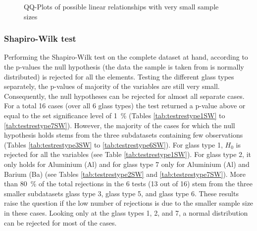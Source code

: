 \documentclass[a4paper, 12pt, titlepage, headsepline, listof = totoc, bibliography = totoc, numbers = noenddot]{scrartcl}
\begin{document}
\begin{figure}[h!]
\begin{subfigure}{.5\textwidth}
  \vspace{-1cm}
  \caption{}
  \label{fig:QQsampleslin2b}
\end{subfigure}
\caption{QQ-Plots of possible linear relationships with very small sample sizes}
\label{fig:QQsampleslin2}
\end{figure}

\subsubsection{Shapiro-Wilk test}\label{sec:shapiro-original}
Performing the Shapiro-Wilk test on the complete dataset at hand, according to the p-values the null hypothesis (the data the sample is taken from is normally distributed) is rejected for all the elements.
Testing the different glass types separately, the p-values of majority of the variables are still very small. Consequently, the null hypotheses can be rejected for almost all separate cases. For a total 16 cases (over all 6 glass types) the test returned a p-value above or equal to the set significance level of 1\, \% (Tables \ref{tab:testrestype1SW} to \ref{tab:testrestype7SW}). However, the majority of the cases for which the null hypothesis holds stems from the three subdatasets containing few observations (Tables \ref{tab:testrestype3SW} to \ref{tab:testrestype6SW}). For glass type 1, $H_0$ is rejected for all the variables (see Table \ref{tab:testrestype1SW}). For glass type 2, it only holds for Aluminium (Al) and for glass type 7 only for Aluminium (Al) and Barium (Ba) (see Tables \ref{tab:testrestype2SW} and \ref{tab:testrestype7SW}).
More than 80\, \% of the total rejections in the 6 tests (13 out of 16) stem from the three smaller subdatasets glass type 3, glass type 5, and glass type 6. These results raise the question if the low number of rejections is due to the smaller sample size in these cases. Looking only at the glass types 1, 2, and 7, a normal distribution can be rejected for most of the cases.
\end{document}

